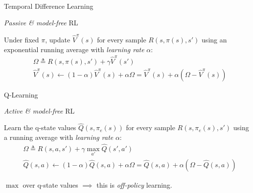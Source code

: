 \documentclass{cognito}
\begin{document}
\begin{note}{Temporal Difference Learning}
	\begin{mdframed}[linecolor=black!25!white]
		\emph{Passive \& model-free} RL
	\end{mdframed}
	Under fixed $\pi$, update $\hat{V}^\pi(s)$ for every sample $R(s, \pi(s), s')$ using
	an exponential running average with \emph{learning rate} $\alpha$:
	\begin{align*}
		&\Omega \triangleq R(s, \pi(s), s') + \gamma \hat{V}^\pi(s')\\
		&\hat{V}^\pi(s) \leftarrow (1 - \alpha) \hat{V}^\pi(s) + \alpha \Omega = \hat{V}^\pi(s) + \alpha( \Omega - \hat{V}^\pi(s) )
	\end{align*}
	\vspace{-10pt}
\end{note}


\begin{note}{Q-Learning}
	\begin{mdframed}[linecolor=black!25!white]
		\emph{Active \& model-free} RL
	\end{mdframed}
	Learn the q-state values $\hat{Q}(s, \pi_e(s))$ for every sample $R(s, \pi_e(s), s')$ using
	a running average with \emph{learning rate} $\alpha$:
	\begin{align*}
		&\textstyle \Omega \triangleq R(s, a, s') + \gamma \max_{a'} \hat{Q}(s',a')\\
		&\textstyle \hat{Q}(s,a) \leftarrow (1 - \alpha) \hat{Q}(s,a) + \alpha \Omega = \hat{Q}(s,a) + \alpha ( \Omega - \hat{Q}(s,a))
	\end{align*}
	\begin{remark} $\max$ over q-state values $\implies$ this is \emph{off-policy} learning.
	\end{remark}
	\vspace{-5pt}
\end{note}

\end{document}

